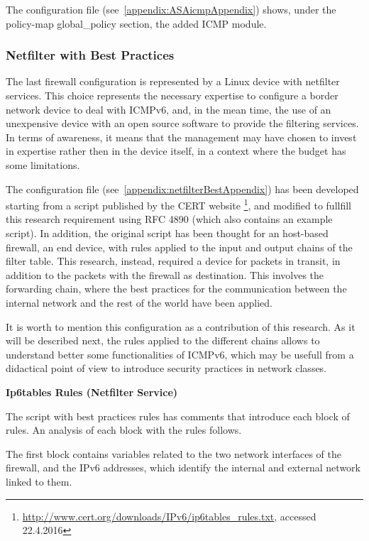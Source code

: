 \documentclass[12pt]{article}
\begin{document}
The configuration file (see~\ref{appendix:ASAicmpAppendix}) shows, under the policy-map global_policy section, the added ICMP module.

\subsubsection{Netfilter with Best Practices}
\label{subsub:netfilterBestPractices}

The last firewall configuration is represented by a Linux device with netfilter services. This choice represents the necessary expertise to configure a border network device to deal with ICMPv6, and, in the mean time, the use of an unexpensive device with an open source software to provide the filtering services. In terms of awareness, it means that the management may have chosen to invest in expertise rather then in the device itself, in a context where the budget has some limitations.

The configuration file (see~\ref{appendix:netfilterBestAppendix}) has been developed starting from a script published by the CERT website \footnote{\url{http://www.cert.org/downloads/IPv6/ip6tables_rules.txt}, accessed 22.4.2016}, and modified to fullfill this research requirement using RFC 4890 (which also contains an example script)\cite{rfc4890}. In addition, the original script has been thought for an host-based firewall, an end device, with rules applied to the input and output chains of the filter table. This research, instead, required a device for packets in transit, in addition to the packets with the firewall as destination. This involves the forwarding chain, where the best practices for the communication between the internal network and the rest of the world have been applied.

It is worth to mention this configuration as a contribution of this research. As it will be described next, the rules applied to the different chains allows to understand better some functionalities of ICMPv6, which may be usefull from a didactical point of view to introduce security practices in network classes.

\textbf{Ip6tables Rules (Netfilter Service)}

The script with best practices rules has comments that introduce each block of rules. An analysis of each block with the rules follows.

The first block contains variables related to the two network interfaces of the firewall, and the IPv6 addresses, which identify the internal and external network linked to them.
\end{document}
